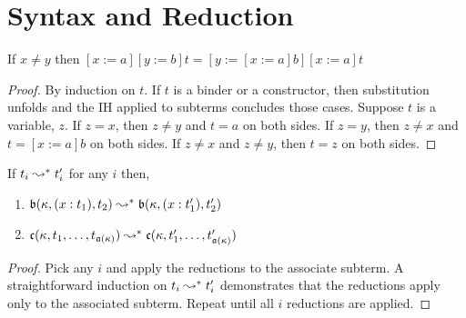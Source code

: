 \section{Syntax and Reduction}




\begin{lemma}
    If $x \neq y$ then $[x := a][y := b]t = [y := [x := a]b][x := a]t$
    \label{lem:2:subst_commute}
\end{lemma}
\begin{proof}
    By induction on $t$.
    If $t$ is a binder or a constructor, then substitution unfolds and the IH applied to subterms concludes those cases.
    Suppose $t$ is a variable, $z$.
    If $z = x$, then $z \neq y$ and $t = a$ on both sides.
    If $z = y$, then $z \neq x$ and $t = [x := a]b$ on both sides.
    If $z \neq x$ and $z \neq y$, then $t = z$ on both sides.
\end{proof}

\begin{lemma}
    If $t_i \leadsto^* t_i^\prime$ for any $i$ then,
    \begin{enumerate}
        \item $\mathfrak{b}(\kappa, (x : t_1), t_2) \leadsto^* \mathfrak{b}(\kappa, (x : t_1^\prime), t_2^\prime)$
        \item $\mathfrak{c}(\kappa, t_1,\ldots,t_{\mathfrak{a}(\kappa)}) \leadsto^* \mathfrak{c}(\kappa, t_1^\prime,\ldots,t_{\mathfrak{a}(\kappa)}^\prime)$
    \end{enumerate}
    \label{lem:2:beta_par}
\end{lemma}
\begin{proof}
    Pick any $i$ and apply the reductions to the associate subterm.
    A straightforward induction on $t_i \leadsto^* t_i^\prime$ demonstrates that the reductions apply only to the associated subterm.
    Repeat until all $i$ reductions are applied.
\end{proof}

